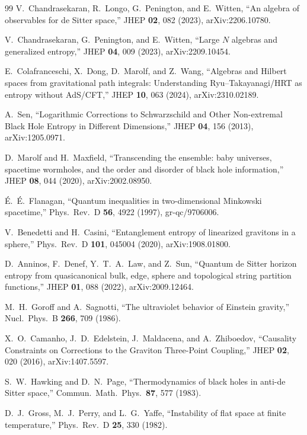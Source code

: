 \documentclass[onecolumn,11pt,aps,prd,amsmath,amssymb,nofootinbib,floatfix]{revtex4-2}
\begin{document}
\begin{thebibliography}{99}
V.~Chandrasekaran, R.~Longo, G.~Penington, and E.~Witten, ``An algebra of observables for de Sitter space,'' JHEP \textbf{02}, 082 (2023), arXiv:2206.10780.

V.~Chandrasekaran, G.~Penington, and E.~Witten, ``Large $N$ algebras and generalized entropy,'' JHEP \textbf{04}, 009 (2023), arXiv:2209.10454.

E.~Colafranceschi, X.~Dong, D.~Marolf, and Z.~Wang, ``Algebras and Hilbert spaces from gravitational path integrals: Understanding Ryu--Takayanagi/HRT as entropy without AdS/CFT,'' JHEP \textbf{10}, 063 (2024), arXiv:2310.02189.

A.~Sen, ``Logarithmic Corrections to Schwarzschild and Other Non-extremal Black Hole Entropy in Different Dimensions,'' JHEP \textbf{04}, 156 (2013), arXiv:1205.0971.

D.~Marolf and H.~Maxfield, ``Transcending the ensemble: baby universes, spacetime wormholes, and the order and disorder of black hole information,'' JHEP \textbf{08}, 044 (2020), arXiv:2002.08950.

\'E.~\'E.~Flanagan, ``Quantum inequalities in two-dimensional Minkowski spacetime,'' Phys.\ Rev.\ D \textbf{56}, 4922 (1997), gr-qc/9706006.

V.~Benedetti and H.~Casini, ``Entanglement entropy of linearized gravitons in a sphere,'' Phys.\ Rev.\ D \textbf{101}, 045004 (2020), arXiv:1908.01800.

D.~Anninos, F.~Denef, Y.~T.~A.~Law, and Z.~Sun, ``Quantum de Sitter horizon entropy from quasicanonical bulk, edge, sphere and topological string partition functions,'' JHEP \textbf{01}, 088 (2022), arXiv:2009.12464.

M.~H.~Goroff and A.~Sagnotti, ``The ultraviolet behavior of Einstein gravity,'' Nucl.\ Phys.\ B \textbf{266}, 709 (1986).

X.~O.~Camanho, J.~D.~Edelstein, J.~Maldacena, and A.~Zhiboedov, ``Causality Constraints on Corrections to the Graviton Three-Point Coupling,'' JHEP \textbf{02}, 020 (2016), arXiv:1407.5597.

S.~W.~Hawking and D.~N.~Page, ``Thermodynamics of black holes in anti-de Sitter space,'' Commun.\ Math.\ Phys.\ \textbf{87}, 577 (1983).

D.~J.~Gross, M.~J.~Perry, and L.~G.~Yaffe, ``Instability of flat space at finite temperature,'' Phys.\ Rev.\ D \textbf{25}, 330 (1982).


\end{thebibliography}
\end{document}

